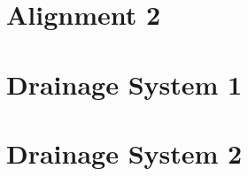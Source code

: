 \documentclass{scrartcl}
\begin{document}
\section{Alignment 2}
\label{sec:alignment_12d_2}
\clearpage



\section{Drainage System 1}
\label{sec:drainage_1}
\clearpage

\section{Drainage System 2}
\label{sec:drainage_2}
\clearpage
\end{document}
